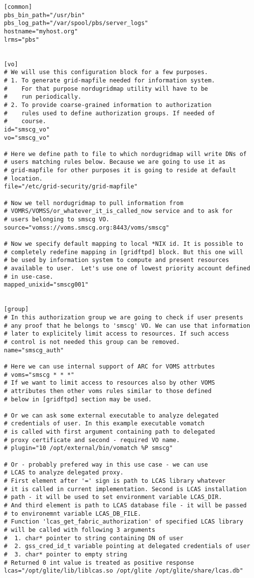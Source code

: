 \documentclass{article}
\begin{document}
\begin{verbatim}
[common]
pbs_bin_path="/usr/bin"
pbs_log_path="/var/spool/pbs/server_logs"
hostname="myhost.org"
lrms="pbs"


[vo]
# We will use this configuration block for a few purposes.
# 1. To generate grid-mapfile needed for information system.
#    For that purpose nordugridmap utility will have to be 
#    run periodically.
# 2. To provide coarse-grained information to authorization 
#    rules used to define authorization groups. If needed of
#    course.
id="smscg_vo"
vo="smscg_vo"

# Here we define path to file to which nordugridmap will write DNs of
# users matching rules below. Because we are going to use it as
# grid-mapfile for other purposes it is going to reside at default
# location.  
file="/etc/grid-security/grid-mapfile"

# Now we tell nordugridmap to pull information from
# VOMRS/VOMSS/or_whatever_it_is_called_now service and to ask for
# users belonging to smscg VO.
source="vomss://voms.smscg.org:8443/voms/smscg"

# Now we specify default mapping to local *NIX id. It is possible to
# completely redefine mapping in [gridftpd] block. But this one will
# be used by information system to compute and present resources
# available to user.  Let's use one of lowest priority account defined
# in use-case.
mapped_unixid="smscg001"


[group]
# In this authorization group we are going to check if user presents
# any proof that he belongs to 'smscg' VO. We can use that information 
# later to explicitely limit access to resources. If such access 
# control is not needed this group can be removed.
name="smscg_auth"

# Here we can use internal support of ARC for VOMS attrbutes
# voms="smscg * * *"
# If we want to limit access to resources also by other VOMS
# attributes then other voms rules similar to those defined
# below in [gridftpd] section may be used.

# Or we can ask some external executable to analyze delegated
# credentials of user. In this example executable vomatch 
# is called with first argument containing path to delegated
# proxy certificate and second - required VO name.
# plugin="10 /opt/external/bin/vomatch %P smscg"

# Or - probably prefered way in this use case - we can use 
# LCAS to analyze delegated proxy.
# First element after '=' sign is path to LCAS library whatever
# it is called in current implementation. Second is LCAS installation
# path - it will be used to set environment variable LCAS_DIR.
# And third element is path to LCAS database file - it will be passed
# to environemnt variable LCAS_DB_FILE.
# Function 'lcas_get_fabric_authorization' of specified LCAS library
# will be called with following 3 arguments
#  1. char* pointer to string containing DN of user
#  2. gss_cred_id_t variable pointing at delegated credentials of user
#  3. char* pointer to empty string
# Returned 0 int value is treated as positive response
lcas="/opt/glite/lib/liblcas.so /opt/glite /opt/glite/share/lcas.db"


\end{verbatim}
\end{document}
